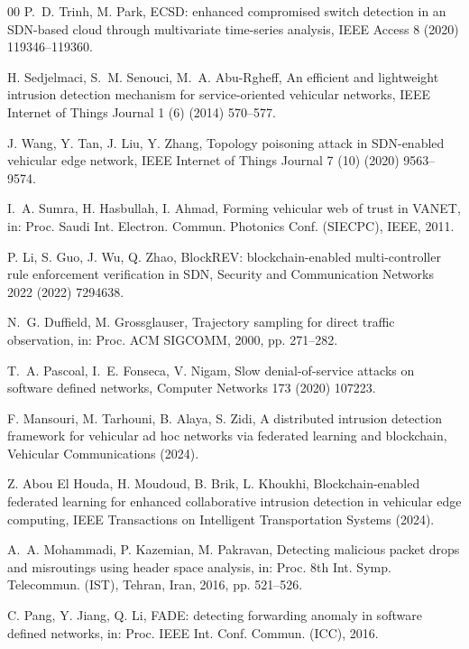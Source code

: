 \documentclass[final,5p,twocolumn]{elsarticle}
\theoremstyle{remark}
\theoremstyle{plain}
\begin{document}
\begin{thebibliography}{00}
	P.~D. Trinh, M. Park, ECSD: enhanced compromised switch detection in an SDN-based cloud through multivariate time-series analysis, IEEE Access 8 (2020) 119346--119360.

	H. Sedjelmaci, S.~M. Senouci, M.~A. Abu-Rgheff, An efficient and lightweight intrusion detection mechanism for service-oriented vehicular networks, IEEE Internet of Things Journal 1 (6) (2014) 570--577.

	J. Wang, Y. Tan, J. Liu, Y. Zhang, Topology poisoning attack in SDN-enabled vehicular edge network, IEEE Internet of Things Journal 7 (10) (2020) 9563--9574.

	I.~A. Sumra, H. Hasbullah, I. Ahmad, Forming vehicular web of trust in VANET, in: Proc. Saudi Int. Electron. Commun. Photonics Conf. (SIECPC), IEEE, 2011.

	P. Li, S. Guo, J. Wu, Q. Zhao, BlockREV: blockchain-enabled multi-controller rule enforcement verification in SDN, Security and Communication Networks 2022 (2022) 7294638.

	N.~G. Duffield, M. Grossglauser, Trajectory sampling for direct traffic observation, in: Proc. ACM SIGCOMM, 2000, pp. 271--282.

	T.~A. Pascoal, I.~E. Fonseca, V. Nigam, Slow denial-of-service attacks on software defined networks, Computer Networks 173 (2020) 107223.

	F. Mansouri, M. Tarhouni, B. Alaya, S. Zidi, A distributed intrusion detection framework for vehicular ad hoc networks via federated learning and blockchain, Vehicular Communications (2024).

	Z. Abou El Houda, H. Moudoud, B. Brik, L. Khoukhi, Blockchain-enabled federated learning for enhanced collaborative intrusion detection in vehicular edge computing, IEEE Transactions on Intelligent Transportation Systems (2024).

	A.~A. Mohammadi, P. Kazemian, M. Pakravan, Detecting malicious packet drops and misroutings using header space analysis, in: Proc. 8th Int. Symp. Telecommun. (IST), Tehran, Iran, 2016, pp. 521--526.

	C. Pang, Y. Jiang, Q. Li, FADE: detecting forwarding anomaly in software defined networks, in: Proc. IEEE Int. Conf. Commun. (ICC), 2016.


\end{thebibliography}
\end{document}
